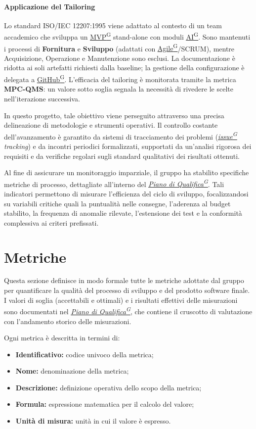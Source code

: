 \documentclass[a4paper,12pt]{article}
\providecommand{\glslink}[2]{\href{https://alittlebyte-19.github.io/Documentazione/glossario.html\#gls-#1}{\underline{#2}\textsuperscript{\scriptsize G}}}
\begin{document}
\paragraph{Applicazione del Tailoring}
Lo standard ISO/IEC 12207:1995 viene adattato al contesto di un team accademico che sviluppa un \glslink{mvp-minimum-viable-product}{MVP} stand-alone con moduli \glslink{intelligenza-artificiale-ai}{AI}. Sono mantenuti i processi di \textbf{Fornitura} e \textbf{Sviluppo} (adattati con \glslink{agile}{Agile}/SCRUM), mentre Acquisizione, Operazione e Manutenzione sono esclusi. La documentazione è ridotta ai soli artefatti richiesti dalla baseline; la gestione della configurazione è delegata a \glslink{github}{GitHub}. L'efficacia del tailoring è monitorata tramite la metrica \textbf{MPC-QMS}: un valore sotto soglia segnala la necessità di rivedere le scelte nell'iterazione successiva.

In questo progetto, tale obiettivo viene perseguito attraverso una precisa delineazione di metodologie e strumenti operativi. Il controllo costante dell'avanzamento è garantito da sistemi di tracciamento dei problemi (\textit{\glslink{issue}{issue} tracking}) e da incontri periodici formalizzati, supportati da un'analisi rigorosa dei requisiti e da verifiche regolari sugli standard qualitativi dei risultati ottenuti.

Al fine di assicurare un monitoraggio imparziale, il gruppo ha stabilito specifiche metriche di processo, dettagliate all'interno del \textit{\glslink{piano-di-qualifica}{Piano di Qualifica}}. Tali indicatori permettono di misurare l'efficienza del ciclo di sviluppo, focalizzandosi su variabili critiche quali la puntualità nelle consegne, l'aderenza al budget stabilito, la frequenza di anomalie rilevate, l'estensione dei test e la conformità complessiva ai criteri prefissati.

\section{Metriche}
Questa sezione definisce in modo formale tutte le metriche adottate dal gruppo per quantificare la qualità del processo di sviluppo e del prodotto software finale. I valori di soglia (accettabili e ottimali) e i risultati effettivi delle misurazioni sono documentati nel \textit{\glslink{piano-di-qualifica}{Piano di Qualifica}}, che contiene il cruscotto di valutazione con l'andamento storico delle misurazioni.

Ogni metrica è descritta in termini di:
\begin{itemize}
    \item \textbf{Identificativo:} codice univoco della metrica;
    \item \textbf{Nome:} denominazione della metrica;
    \item \textbf{Descrizione:} definizione operativa dello scopo della metrica;
    \item \textbf{Formula:} espressione matematica per il calcolo del valore;
    \item \textbf{Unità di misura:} unità in cui il valore è espresso.
\end{itemize}
\end{document}
